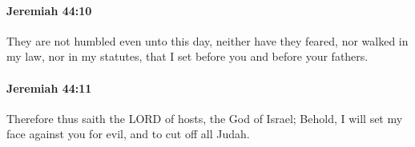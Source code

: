		\paragraph{Jeremiah 44:10} %
			\label{JEREMIAH-44-10}

			They are not humbled even unto this day, neither have they feared, nor walked in my law, nor in my statutes, that I set before you and before your fathers.


		\paragraph{Jeremiah 44:11} %
			\label{JEREMIAH-44-11}

			Therefore thus saith the LORD of hosts, the God of Israel; Behold, I will set my face against you for evil, and to cut off all Judah.


